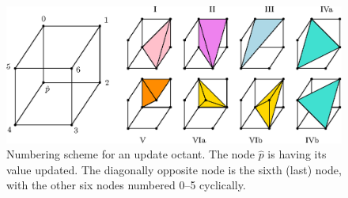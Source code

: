 \documentclass[eikonal.tex]{subfiles}
\begin{document}
\begin{figure}[t]
  \centering
  \includegraphics{simplex-groups.eps}
  \caption{Numbering scheme for an update octant. The node $\hat{p}$
    is having its value updated. The diagonally opposite node is the
    sixth (last) node, with the other six nodes numbered 0--5
    cyclically.}\label{fig:octant-numbering}
\end{figure}
  
\end{document}
